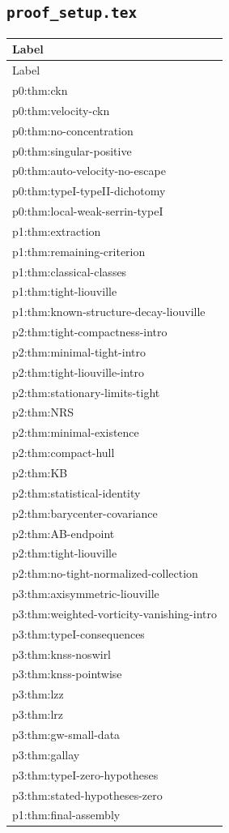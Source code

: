 \documentclass[11pt]{amsart}
\begin{document}
\subsection{\texorpdfstring{\texttt{proof\_setup.tex}}{proof setup.tex}}

\begin{longtable}{@{}>{\ttfamily\footnotesize\raggedright\arraybackslash}p{}@{}}
\toprule
Label\\
\midrule
\endfirsthead
\toprule
Label\\
\midrule
\endhead
p0:thm:ckn\\
p0:thm:velocity-ckn\\
p0:thm:no-concentration\\
p0:thm:singular-positive\\
p0:thm:auto-velocity-no-escape\\
p0:thm:typeI-typeII-dichotomy\\
p0:thm:local-weak-serrin-typeI\\
p1:thm:extraction\\
p1:thm:remaining-criterion\\
p1:thm:classical-classes\\
p1:thm:tight-liouville\\
p1:thm:known-structure-decay-liouville\\
p2:thm:tight-compactness-intro\\
p2:thm:minimal-tight-intro\\
p2:thm:tight-liouville-intro\\
p2:thm:stationary-limits-tight\\
p2:thm:NRS\\
p2:thm:minimal-existence\\
p2:thm:compact-hull\\
p2:thm:KB\\
p2:thm:statistical-identity\\
p2:thm:barycenter-covariance\\
p2:thm:AB-endpoint\\
p2:thm:tight-liouville\\
p2:thm:no-tight-normalized-collection\\
p3:thm:axisymmetric-liouville\\
p3:thm:weighted-vorticity-vanishing-intro\\
p3:thm:typeI-consequences\\
p3:thm:knss-noswirl\\
p3:thm:knss-pointwise\\
p3:thm:lzz\\
p3:thm:lrz\\
p3:thm:gw-small-data\\
p3:thm:gallay\\
p3:thm:typeI-zero-hypotheses\\
p3:thm:stated-hypotheses-zero\\
p1:thm:final-assembly\\
\bottomrule
\end{longtable}
\end{document}
